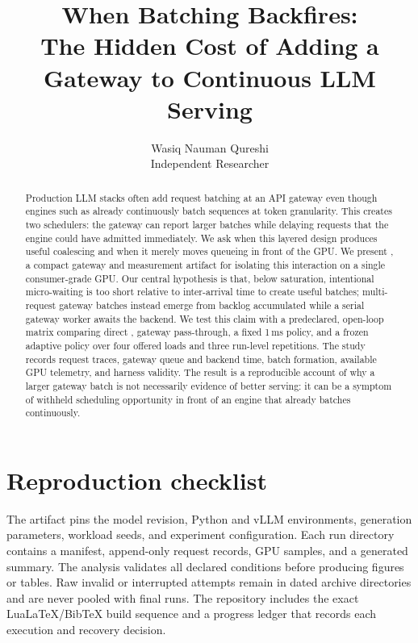 \documentclass[10pt]{article}
\title{When Batching Backfires:\\
The Hidden Cost of Adding a Gateway to Continuous LLM Serving}
\author{Wasiq Nauman Qureshi\\Independent Researcher}
\date{}
\begin{document}
\maketitle

\begin{abstract}
Production LLM stacks often add request batching at an API gateway even though
engines such as \vllm{} already continuously batch sequences at token
granularity. This creates two schedulers: the gateway can report larger batches
while delaying requests that the engine could have admitted immediately. We
ask when this layered design produces useful coalescing and when it merely
moves queueing in front of the GPU. We present \adip{}, a compact gateway and
measurement artifact for isolating this interaction on a single consumer-grade
GPU. Our central hypothesis is that, below saturation, intentional
micro-waiting is too short relative to inter-arrival time to create useful
batches; multi-request gateway batches instead emerge from backlog accumulated
while a serial gateway worker awaits the backend. We test this claim with a
predeclared, open-loop matrix comparing direct \vllm{}, gateway pass-through,
a fixed 1\,ms policy, and a frozen adaptive policy over four offered loads and
three run-level repetitions. The study records request traces, gateway queue
and backend time, batch formation, available GPU telemetry, and harness
validity.
\HeadlineResults{} The result is a reproducible account of why a larger gateway
batch is not necessarily evidence of better serving: it can be a symptom of
withheld scheduling opportunity in front of an engine that already batches
continuously.
\end{abstract}












\appendix
\section{Reproduction checklist}
\label{app:reproduction}
The artifact pins the model revision, Python and vLLM environments, generation
parameters, workload seeds, and experiment configuration. Each run directory
contains a manifest, append-only request records, GPU samples, and a generated
summary. The analysis validates all declared conditions before producing
figures or tables. Raw invalid or interrupted attempts remain in dated archive
directories and are never pooled with final runs. The repository includes the
exact LuaLaTeX/BibTeX build sequence and a progress ledger that records each
execution and recovery decision.
\end{document}
